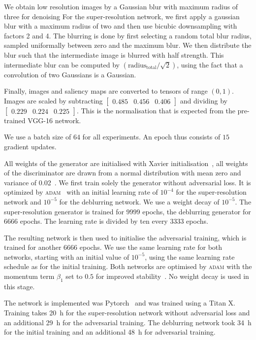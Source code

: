 \documentclass{scrartcl}
\begin{document}
We obtain low resolution images by a Gaussian blur with maximum radius of three for denoising
For the super-resolution network, we first apply a gaussian blur with a maximum radius of two and then use bicubic downsampling with factors 2 and 4.
The blurring is done by first selecting a random total blur radius, sampled uniformally between zero and the maximum blur.
We then distribute the blur such that the intermediate image is blurred with half strength.
This intermediate blur can be computed by \( \left( \text{radius}_{\text{total}} / \sqrt{2} \right)\), using the fact that a convolution of two Gaussians is a Gaussian.

Finally, images and saliency maps are converted to tensors of range $(0,1)$.
Images are scaled by subtracting
\(
\begin{bmatrix}
 0.485 & 0.456 & 0.406 
\end{bmatrix}
\)
and dividing by
\(
\begin{bmatrix}
0.229 & 0.224& 0.225
\end{bmatrix}
\).
This is the normalisation that is expected from the pre-trained VGG-16 network.

We use a batch size of $64$ for all experiments.
An epoch thus consists of $15$ gradient updates.

All weights of the generator are initialised with Xavier initialisation~\cite{Xavier}, all weights of the discriminator are drawn from a normal distribution with mean zero and variance of 0.02~\cite{PatchGAN}. 
We first train solely the generator without adversarial loss.
It is optimized by \textsc{adam}~\cite{Adam} with an initial learning rate of $10^{-4}$ for the super-resolution network and $10^{-5}$ for the deblurring network.
We use a weight decay of $10^{-5}$.
The super-resolution generator is trained for $9999$ epochs, the deblurring generator for $6666$ epochs.
The learning rate is divided by ten every $3333$ epochs.

The resulting network is then used to initialise the adversarial training, which is trained for another $6666$ epochs.
We use the same learning rate for both networks, starting with an initial value of $10^{-5}$, using the same learning rate schedule as for the initial training.
Both networks are optimised by \textsc{adam} with the momentum term $\beta_1$ set to $0.5$ for improved stability~\cite{Dcgan}.
No weight decay is used in this stage.

The network is implemented was Pytorch~\cite{Pytorch} and was trained using a Titan X.
Training takes \SI{20}{\hour} for the super-resolution network without adversarial loss and an additional \SI{29}{\hour} for the adversarial training.
The deblurring network took \SI{34}{\hour} for the initial training and an additional \SI{48}{\hour} for adversarial training.
\end{document}
